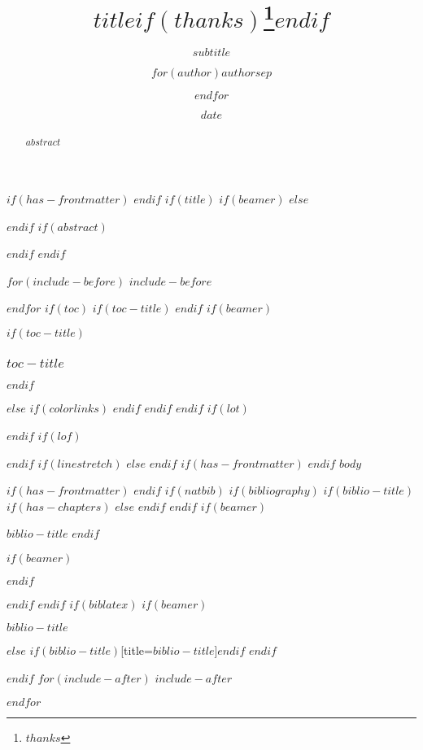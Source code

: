 \documentclass[
  $if(fontsize)$
    $fontsize$,
  $endif$
  $if(lang)$
    $babel-lang$,
  $endif$
  $if(papersize)$
    $papersize$paper,
  $endif$
  $if(beamer)$
    ignorenonframetext,
    $if(handout)$
      handout,
    $endif$
    $if(aspectratio)$
      aspectratio=$aspectratio$,
    $endif$
  $endif$
  $for(classoption)$
    $classoption$$sep$,
  $endfor$
]{$documentclass$}
\title{$title$$if(thanks)$\thanks{$thanks$}$endif$}
\subtitle{$subtitle$}
\author{$for(author)$$author$$sep$ \and $endfor$}
\date{$date$}
\institute{$for(institute)$$institute$$sep$ \and $endfor$}
\newif\ifbibliography
\begin{document}
$if(has-frontmatter)$
  \frontmatter
$endif$
$if(title)$
  $if(beamer)$
    \frame{\titlepage}
  $else$
    \maketitle
  $endif$
  $if(abstract)$
  \begin{abstract}
    $abstract$
  \end{abstract}
  $endif$
$endif$

$for(include-before)$
  $include-before$

$endfor$
$if(toc)$
  $if(toc-title)$
    \renewcommand*\contentsname{$toc-title$}
  $endif$
  $if(beamer)$
  \begin{frame}
    $if(toc-title)$
      \frametitle{$toc-title$}
    $endif$
    \tableofcontents[hideallsubsections]
  \end{frame}
  $else$
    {
      $if(colorlinks)$
        \hypersetup{linkcolor=$if(toccolor)$$toccolor$$else$$endif$}
      $endif$
      \setcounter{tocdepth}{$toc-depth$}
      \tableofcontents
    }
  $endif$
$endif$
$if(lot)$
  \listoftables
$endif$
$if(lof)$
  \listoffigures
$endif$
$if(linestretch)$
$else$
$endif$
$if(has-frontmatter)$
  \mainmatter
$endif$
$body$

$if(has-frontmatter)$
  \backmatter
$endif$
$if(natbib)$
  $if(bibliography)$
    $if(biblio-title)$
      $if(has-chapters)$
        \renewcommand\bibname{$biblio-title$}
      $else$
        \renewcommand\refname{$biblio-title$}
      $endif$
    $endif$
    $if(beamer)$
      \begin{frame}[allowframebreaks]{$biblio-title$}
        \bibliographytrue
    $endif$
    
    $if(beamer)$
      \end{frame}
    $endif$

  $endif$
$endif$
$if(biblatex)$
  $if(beamer)$
    \begin{frame}[allowframebreaks]{$biblio-title$}
      \bibliographytrue
      \printbibliography[heading=none]
    \end{frame}
  $else$
    \printbibliography$if(biblio-title)$[title=$biblio-title$]$endif$
  $endif$

$endif$
$for(include-after)$
  $include-after$

$endfor$
\end{document}
